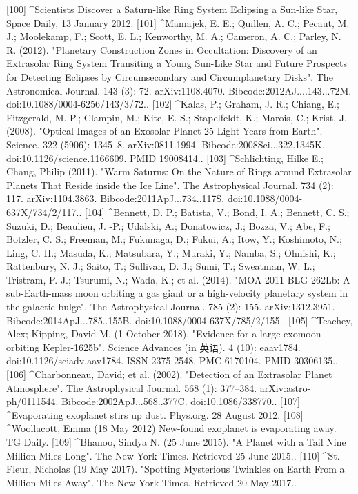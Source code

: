 [100]
^Scientists Discover a Saturn-like Ring System Eclipsing a Sun-like Star, Space Daily, 13 January 2012.
[101]
^Mamajek, E. E.; Quillen, A. C.; Pecaut, M. J.; Moolekamp, F.; Scott, E. L.; Kenworthy, M. A.; Cameron, A. C.; Parley, N. R. (2012). "Planetary Construction Zones in Occultation: Discovery of an Extrasolar Ring System Transiting a Young Sun-Like Star and Future Prospects for Detecting Eclipses by Circumsecondary and Circumplanetary Disks". The Astronomical Journal. 143 (3): 72. arXiv:1108.4070. Bibcode:2012AJ....143...72M. doi:10.1088/0004-6256/143/3/72..
[102]
^Kalas, P.; Graham, J. R.; Chiang, E.; Fitzgerald, M. P.; Clampin, M.; Kite, E. S.; Stapelfeldt, K.; Marois, C.; Krist, J. (2008). "Optical Images of an Exosolar Planet 25 Light-Years from Earth". Science. 322 (5906): 1345–8. arXiv:0811.1994. Bibcode:2008Sci...322.1345K. doi:10.1126/science.1166609. PMID 19008414..
[103]
^Schlichting, Hilke E.; Chang, Philip (2011). "Warm Saturns: On the Nature of Rings around Extrasolar Planets That Reside inside the Ice Line". The Astrophysical Journal. 734 (2): 117. arXiv:1104.3863. Bibcode:2011ApJ...734..117S. doi:10.1088/0004-637X/734/2/117..
[104]
^Bennett, D. P.; Batista, V.; Bond, I. A.; Bennett, C. S.; Suzuki, D.; Beaulieu, J. -P.; Udalski, A.; Donatowicz, J.; Bozza, V.; Abe, F.; Botzler, C. S.; Freeman, M.; Fukunaga, D.; Fukui, A.; Itow, Y.; Koshimoto, N.; Ling, C. H.; Masuda, K.; Matsubara, Y.; Muraki, Y.; Namba, S.; Ohnishi, K.; Rattenbury, N. J.; Saito, T.; Sullivan, D. J.; Sumi, T.; Sweatman, W. L.; Tristram, P. J.; Tsurumi, N.; Wada, K.; et al. (2014). "MOA-2011-BLG-262Lb: A sub-Earth-mass moon orbiting a gas giant or a high-velocity planetary system in the galactic bulge". The Astrophysical Journal. 785 (2): 155. arXiv:1312.3951. Bibcode:2014ApJ...785..155B. doi:10.1088/0004-637X/785/2/155..
[105]
^Teachey, Alex; Kipping, David M. (1 October 2018). "Evidence for a large exomoon orbiting Kepler-1625b". Science Advances (in 英语). 4 (10): eaav1784. doi:10.1126/sciadv.aav1784. ISSN 2375-2548. PMC 6170104. PMID 30306135..
[106]
^Charbonneau, David; et al. (2002). "Detection of an Extrasolar Planet Atmosphere". The Astrophysical Journal. 568 (1): 377–384. arXiv:astro-ph/0111544. Bibcode:2002ApJ...568..377C. doi:10.1086/338770..
[107]
^Evaporating exoplanet stirs up dust. Phys.org. 28 August 2012.
[108]
^Woollacott, Emma (18 May 2012) New-found exoplanet is evaporating away. TG Daily.
[109]
^Bhanoo, Sindya N. (25 June 2015). "A Planet with a Tail Nine Million Miles Long". The New York Times. Retrieved 25 June 2015..
[110]
^St. Fleur, Nicholas (19 May 2017). "Spotting Mysterious Twinkles on Earth From a Million Miles Away". The New York Times. Retrieved 20 May 2017..
